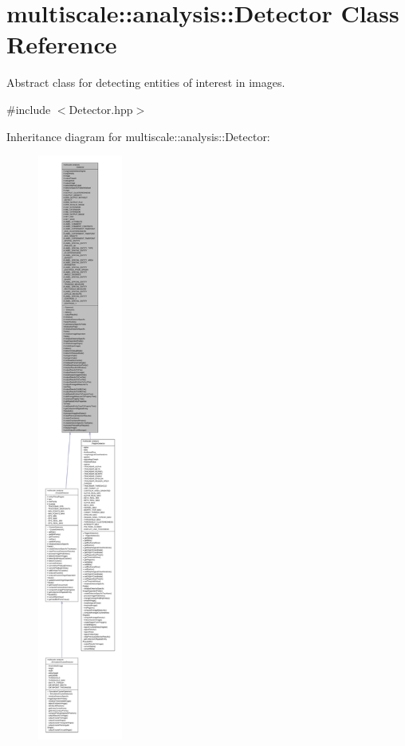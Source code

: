 \hypertarget{classmultiscale_1_1analysis_1_1Detector}{\section{multiscale\-:\-:analysis\-:\-:Detector Class Reference}
\label{classmultiscale_1_1analysis_1_1Detector}
}


Abstract class for detecting entities of interest in images.  




{\ttfamily \#include $<$Detector.\-hpp$>$}



Inheritance diagram for multiscale\-:\-:analysis\-:\-:Detector\-:
\nopagebreak
\begin{figure}[H]
\begin{center}
\leavevmode
\includegraphics[height=550pt]{classmultiscale_1_1analysis_1_1Detector__inherit__graph}
\end{center}
\end{figure}


